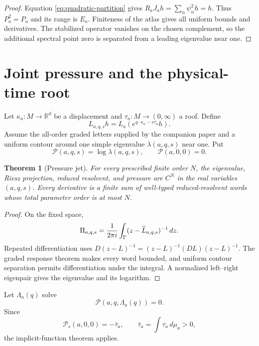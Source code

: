 \documentclass[11pt,reqno]{amsart}
\newtheorem{theorem}{Theorem}[section]
\theoremstyle{definition}
\theoremstyle{remark}
\newcommand{\R}{\mathbb R}
\newcommand{\Piop}{\Pi}
\begin{document}
\begin{proof}
Equation \eqref{eq:quadratic-partition} gives
$R_aJ_ah=\sum_\alpha\psi_\alpha^2h=h$.  Thus $P_a^2=P_a$ and its range is
$E_a$.  Finiteness of the atlas gives all uniform bounds and derivatives.  The
stabilized operator vanishes on the chosen complement, so the additional
spectral point zero is separated from a leading eigenvalue near one.
\end{proof}

\section{Joint pressure and the physical-time root}

Let $\kappa_a:M\to\R^d$ be a displacement and
$\tau_a:M\to(0,\infty)$ a roof.  Define
\begin{equation}\label{eq:twist}
 L_{a,q,s}h=L_a\left(e^{q\cdot\kappa_a-s\tau_a}h\right).
\end{equation}
Assume the all-order graded letters supplied by the companion paper and a
uniform contour around one simple eigenvalue $\lambda(a,q,s)$ near one.  Put
\[
 \mathscr P(a,q,s)=\log\lambda(a,q,s),
 \qquad \mathscr P(a,0,0)=0.
\]

\begin{theorem}[Pressure jet]\label{thm:pressure}
For every prescribed finite order $N$, the eigenvalue, Riesz projection,
reduced resolvent, and pressure are $C^N$ in the real variables $(a,q,s)$.
Every derivative is a finite sum of well-typed reduced-resolvent words whose
total parameter order is at most $N$.
\end{theorem}

\begin{proof}
On the fixed space,
\[
 \Piop_{a,q,s}={1\over2\pi i}\int_\Gamma
 (z-\widehat L_{a,q,s})^{-1}\,dz.
\]
Repeated differentiation uses
$D(z-L)^{-1}=(z-L)^{-1}(DL)(z-L)^{-1}$.  The graded response theorem makes
every word bounded, and uniform contour separation permits differentiation
under the integral.  A normalized left--right eigenpair gives the eigenvalue
and its logarithm.
\end{proof}

Let $\Lambda_a(q)$ solve
\begin{equation}\label{eq:root}
 \mathscr P(a,q,\Lambda_a(q))=0.
\end{equation}
Since
\[
 \mathscr P_s(a,0,0)=-\bar\tau_a,
 \qquad \bar\tau_a=\int\tau_a\,d\mu_a>0,
\]
the implicit-function theorem applies.
\end{document}
